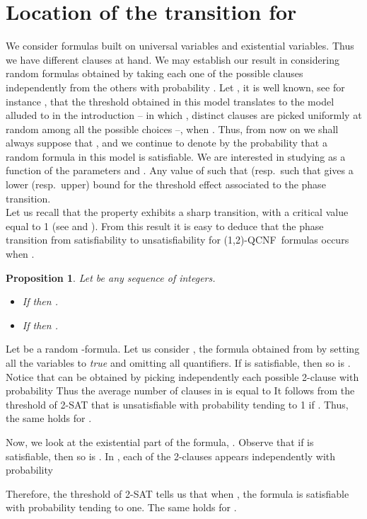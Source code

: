 \documentclass[aop,noinfoline]{imsart}
\newtheorem{proposition}[theorem]{Proposition}
\renewcommand{\Box}{{\vrule width0.6ex height1em depth0cm}}
\newenvironment{proof}{\noindent{\bf Proof:}}{\hfill \Box}
\newcommand{\onetwo}{(1,2)}
\newcommand{\onetwoqcnf}{\mbox{\sf \onetwo-QCNF}}
\begin{document}
\section{Location of the   transition for
}\label{sec:transition}


We consider formulas  built on  universal variables and  existential variables. Thus we have 
 different clauses at hand.  
 We may  establish our result in considering random formulas obtained by taking
each one of the  possible clauses
  independently from the others with probability . Let , 
it is well known, see for instance  \cite[Sections 1.4 and 1.5]{JansonLR-00},  that the threshold obtained in this model translates to the
model alluded to in the introduction -- in which , distinct clauses are picked
uniformly at random among all the  possible choices --,  when .
Thus, from now on we shall always suppose that
, and we continue to denote by  the probability
that a random formula in this model is satisfiable. We are
interested in studying 
as a function of the parameters  and . Any value of  such
that  (resp.\ such that  gives a
lower (resp.\ upper) bound for the threshold effect associated to
the phase transition.\\

 Let us recall that the  property exhibits a sharp transition, with a
critical value equal to 1 (see \cite{ChvatalR-92} and \cite{Goerdt-96}). From
this result it is easy to deduce that the phase transition from satisfiability
to unsatisfiability for  
 \onetwoqcnf\ formulas occurs
when . 
 
\begin{proposition}\label{prop:first_estimates}
  Let  be any sequence of integers.
  \begin{itemize}
  \item If  then .\\
  \item If  then .
  \end{itemize}

\end{proposition}
\begin{proof}
Let  be  a random -formula.
 Let us consider , the
 formula obtained from  by setting all the variables
   to \emph{true} and omitting all quantifiers. If
   is satisfiable, then so is . Notice that  can be
  obtained by picking independently each possible 2-clause with
  probability
   Thus
  the average number of clauses in  is equal to   It follows from the threshold of 2-SAT
  \cite{ChvatalR-92,Goerdt-96} that  is unsatisfiable with
  probability tending to 1 if . Thus, the same holds for .

  Now, we look at the existential part of the formula, . Observe
  that if  is satisfiable, then so is .  In , each of the
   2-clauses appears independently with probability
  
  Therefore,
  the threshold of 2-SAT tells us that when , the formula 
  is satisfiable with probability tending to one. The same holds
  for .
\end{proof}
\medskip
\end{document}
